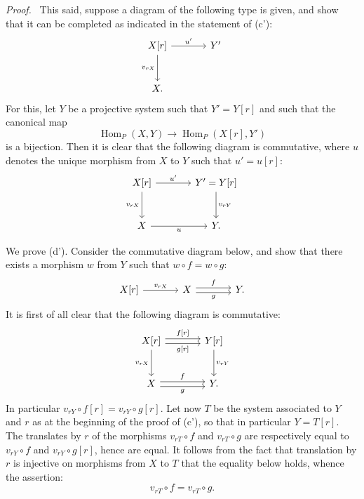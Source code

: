 \documentclass[11pt]{article}
\newenvironment{prooftext}[1][Proof]{\par\noindent\emph{#1.}\ }{\par\medskip}
\DeclareMathOperator{\Hom}{Hom}
\providecommand{\Hom}{\operatorname{Hom}}
\begin{document}
\begin{prooftext}[Proof]
This said, suppose a diagram of the following type is given, and show that it can be completed as indicated in the statement of (c'):
\[
\begin{tikzcd}[column sep=large,row sep=large]
X[r] \arrow[r,"u'"] \arrow[d,"{v_{rX}}"'] & Y'\\
X .
\end{tikzcd}
\]
For this, let $Y$ be a projective system such that $Y'=Y[r]$ and such that the canonical map
\[
\Hom_P(X,Y)\longrightarrow\Hom_P(X[r],Y')
\]
is a bijection. Then it is clear that the following diagram is commutative, where $u$ denotes the unique morphism from $X$ to $Y$ such that $u'=u[r]$:
\[
\begin{tikzcd}[column sep=large,row sep=large]
X[r] \arrow[r,"u'"] \arrow[d,"{v_{rX}}"'] & Y'=Y[r] \arrow[d,"{v_{rY}}"]\\
X \arrow[r,"u"'] & Y .
\end{tikzcd}
\]

We prove (d'). Consider the commutative diagram below, and show that there exists a morphism $w$ from $Y$ such that $w\circ f=w\circ g$:
\[
\begin{tikzcd}[column sep=large]
X[r] \arrow[r,"{v_{rX}}"] & X \arrow[r,shift left,"f"] \arrow[r,shift right,"g"'] & Y .
\end{tikzcd}
\]
It is first of all clear that the following diagram is commutative:
\[
\begin{tikzcd}[column sep=large,row sep=large]
X[r] \arrow[r,shift left,"{f[r]}"] \arrow[r,shift right,"{g[r]}"'] \arrow[d,"{v_{rX}}"'] & Y[r] \arrow[d,"{v_{rY}}"]\\
X \arrow[r,shift left,"f"] \arrow[r,shift right,"g"'] & Y .
\end{tikzcd}
\]
In particular $v_{rY}\circ f[r]=v_{rY}\circ g[r]$. Let now $T$ be the system associated to $Y$ and $r$ as at the beginning of the proof of (c'), so that in particular $Y=T[r]$. The translates by $r$ of the morphisms $v_{rT}\circ f$ and $v_{rT}\circ g$ are respectively equal to $v_{rY}\circ f$ and $v_{rY}\circ g[r]$, hence are equal. It follows from the fact that translation by $r$ is injective on morphisms from $X$ to $T$ that the equality below holds, whence the assertion:
\[
v_{rT}\circ f=v_{rT}\circ g.
\]
\end{prooftext}
\end{document}
